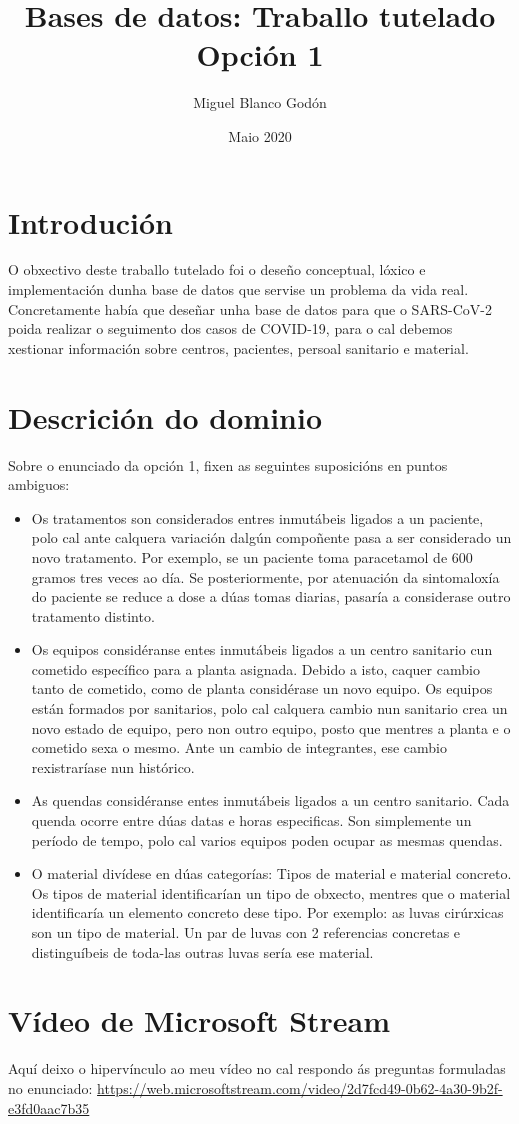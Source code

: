 \documentclass{article}
\begin{document}
\title{Bases de datos: Traballo tutelado
\newline
Opción 1}
\author{Miguel Blanco Godón}
\date{Maio 2020}
\maketitle

\section{Introdución}
O obxectivo deste traballo tutelado foi o deseño conceptual, lóxico e implementación dunha base de datos que servise un problema da vida real. Concretamente había que deseñar unha base de datos para que o SARS-CoV-2 poida realizar o seguimento dos casos de COVID-19, para o cal debemos xestionar información sobre centros, pacientes, persoal sanitario e material.
\section{Descrición do dominio}
Sobre o enunciado da opción 1, fixen as seguintes suposicións en puntos ambiguos:
\begin{itemize}
	\item Os tratamentos son considerados entres inmutábeis ligados a un paciente, polo cal ante calquera variación dalgún compoñente pasa a ser considerado un novo tratamento. Por exemplo, se un paciente toma paracetamol de 600 gramos tres veces ao día. Se posteriormente, por atenuación da sintomaloxía do paciente se reduce a dose a dúas tomas diarias, pasaría a considerase outro tratamento distinto.
	\item Os equipos considéranse entes inmutábeis ligados a un centro sanitario cun cometido específico para a planta asignada. Debido a isto, caquer cambio tanto de cometido, como de planta considérase un novo equipo. Os equipos están formados por sanitarios, polo cal calquera cambio nun sanitario crea un novo estado de equipo, pero non outro equipo, posto que mentres a planta e o cometido sexa o mesmo. Ante un cambio de integrantes, ese cambio rexistraríase nun histórico.
	\item As quendas considéranse entes inmutábeis ligados a un centro sanitario. Cada quenda ocorre entre dúas datas e horas especificas. Son simplemente un período de tempo, polo cal varios equipos poden ocupar as mesmas quendas.
	\item O material divídese en dúas categorías: Tipos de material e material concreto. Os tipos de material identificarían un tipo de obxecto, mentres que o material identificaría un elemento concreto dese tipo. Por exemplo: as luvas cirúrxicas son un tipo de material. Un par de luvas con 2 referencias concretas e distinguíbeis de toda-las outras luvas sería ese material.
\end{itemize}
\section{Vídeo de Microsoft Stream}
Aquí deixo o hipervínculo ao meu vídeo no cal respondo ás preguntas formuladas no enunciado:\newline
\url{https://web.microsoftstream.com/video/2d7fcd49-0b62-4a30-9b2f-e3fd0aac7b35}
\end{document}
